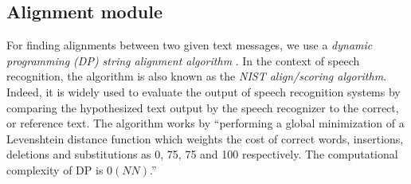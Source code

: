 


\subsection{Alignment module}
\label{secalignmentmodule}



For finding alignments between two given text messages, we use 
a \textit{dynamic programming (DP) string alignment algorithm} \cite{sankoff:1983}. 
In the context of speech recognition, the algorithm is also known as the \textit{NIST align/scoring algorithm}. Indeed, it is widely used to evaluate the output of speech recognition systems by comparing the hypothesized text %
output by the speech recognizer to the correct, or reference %
text. 
%
The %
algorithm works by ``performing a global minimization of a Levenshtein distance function which weights the cost of correct words, insertions, deletions and substitutions as 0, 75, 75 and 100 respectively.
%
The computational complexity of DP is $0(NN)$.''



